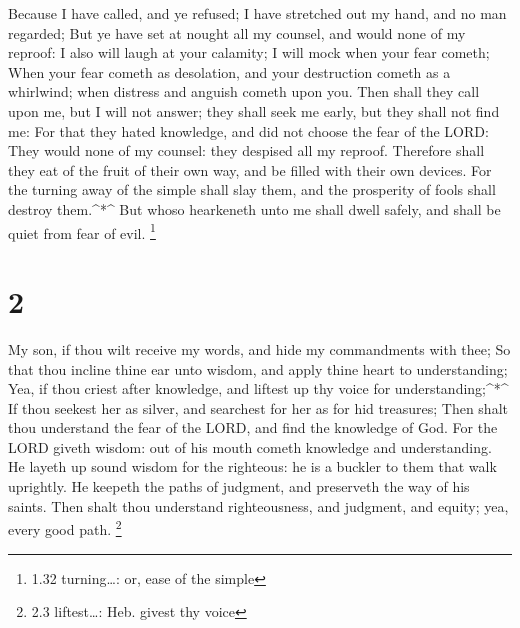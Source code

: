  Because I have called, and ye refused; I have stretched
out my hand, and no man regarded;  But ye have set at
nought all my counsel, and would none of my reproof:  I
also will laugh at your calamity; I will mock when your fear cometh;
 When your fear cometh as desolation, and your destruction
cometh as a whirlwind; when distress and anguish cometh upon you.
 Then shall they call upon me, but I will not answer; they
shall seek me early, but they shall not find me:  For that
they hated knowledge, and did not choose the fear of the LORD:
 They would none of my counsel: they despised all my
reproof.  Therefore shall they eat of the fruit of their
own way, and be filled with their own devices.  For the
turning away of the simple shall slay them, and the prosperity of fools
shall destroy them.\^{}*\^{}  But whoso hearkeneth unto me
shall dwell safely, and shall be quiet from fear of evil. \footnote{1.32
  turning\ldots: or, ease of the simple}

\hypertarget{section-1}{%
\section{2}\label{section-1}}

 My son, if thou wilt receive my words, and hide my
commandments with thee;  So that thou incline thine ear unto
wisdom, and apply thine heart to understanding;  Yea, if
thou criest after knowledge, and liftest up thy voice for
understanding;\^{}*\^{}  If thou seekest her as silver, and
searchest for her as for hid treasures;  Then shalt thou
understand the fear of the LORD, and find the knowledge of God.
 For the LORD giveth wisdom: out of his mouth cometh
knowledge and understanding.  He layeth up sound wisdom for
the righteous: he is a buckler to them that walk uprightly. 
He keepeth the paths of judgment, and preserveth the way of his saints.
 Then shalt thou understand righteousness, and judgment, and
equity; yea, every good path. \footnote{2.3 liftest\ldots: Heb. givest
  thy voice}

